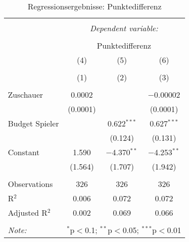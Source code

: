 
\begin{table}[!htbp] \centering 
  \caption{Regressionsergebnisse: Punktedifferenz} 
  \label{} 
\begin{tabular}{@{\extracolsep{5pt}}lccc} 
\\[-1.8ex]\hline 
\hline \\[-1.8ex] 
 & \multicolumn{3}{c}{\textit{Dependent variable:}} \\ 
\cline{2-4} 
\\[-1.8ex] & \multicolumn{3}{c}{Punktedifferenz} \\ 
 & (4) & (5) & (6) \\ 
\\[-1.8ex] & (1) & (2) & (3)\\ 
\hline \\[-1.8ex] 
 Zuschauer & 0.0002 &  & $-$0.00002 \\ 
  & (0.0001) &  & (0.0001) \\ 
  Budget Spieler &  & 0.622$^{***}$ & 0.627$^{***}$ \\ 
  &  & (0.124) & (0.131) \\ 
  Constant & 1.590 & $-$4.370$^{**}$ & $-$4.253$^{**}$ \\ 
  & (1.564) & (1.707) & (1.942) \\ 
 \hline \\[-1.8ex] 
Observations & 326 & 326 & 326 \\ 
R$^{2}$ & 0.006 & 0.072 & 0.072 \\ 
Adjusted R$^{2}$ & 0.002 & 0.069 & 0.066 \\ 
\hline 
\hline \\[-1.8ex] 
\textit{Note:}  & \multicolumn{3}{r}{$^{*}$p$<$0.1; $^{**}$p$<$0.05; $^{***}$p$<$0.01} \\ 
\end{tabular} 
\end{table} 
